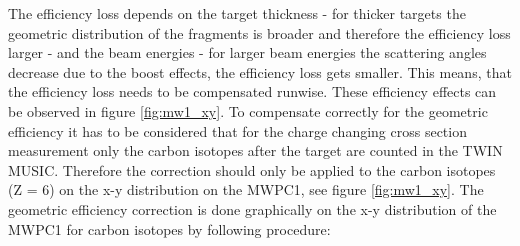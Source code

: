 The efficiency loss depends on the target thickness - for thicker targets the geometric distribution of the fragments is broader and therefore the efficiency loss larger - and the beam energies - for larger beam energies the scattering angles decrease due to the boost effects, the efficiency loss gets smaller. This means, that the efficiency loss needs to be compensated runwise. These efficiency effects can be observed in figure \ref{fig:mw1_xy}.\newline
To compensate correctly for the geometric efficiency it has to be considered that for the charge changing cross section measurement only the carbon isotopes after the target are counted in the TWIN MUSIC. Therefore the correction should only be applied to the carbon isotopes (Z = 6) on the x-y distribution on the MWPC1, see figure \ref{fig:mw1_xy}. The geometric efficiency correction is done graphically on the x-y distribution of the MWPC1 for carbon isotopes by following procedure:
